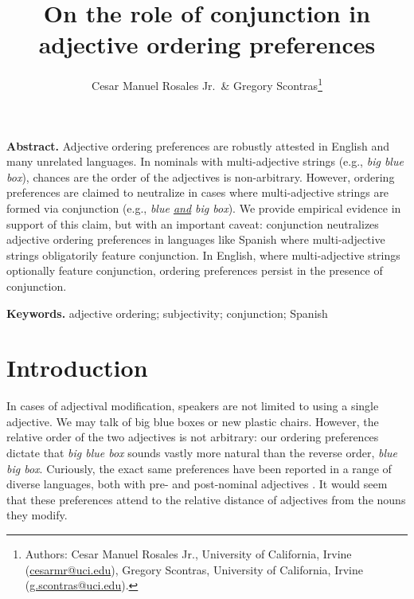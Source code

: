 \documentclass[12pt,letterpaper]{article}
\title{
	On the role of conjunction in adjective ordering preferences
}
\author{Cesar Manuel Rosales Jr.~\& Gregory Scontras\footnote{
		Authors: Cesar Manuel Rosales Jr., University of California, Irvine (\href{mailto:CESARMR@uci.edu}{cesarmr@uci.edu}),
		Gregory Scontras, University of California, Irvine (\href{mailto:g.scontras@uci.edu}{g.scontras@uci.edu}).
	}
}
\renewenvironment{abstract}{%
\noindent\begin{minipage}{1\textwidth}
\setlength{\leftskip}{0.4in}
\setlength{\rightskip}{0.4in}
\textbf{Abstract.}}
{\end{minipage}}
\newenvironment{keywords}{%
\vspace{.5em}
\noindent\begin{minipage}{1\textwidth}
\setlength{\leftskip}{0.4in}
\setlength{\rightskip}{0.4in}
\textbf{Keywords.}}
{\end{minipage}}
\begin{document}
 

\setlength{\Extopsep}{6pt}
\setlength{\Exlabelsep}{9pt}		%
 
\maketitle

\begin{abstract}
	Adjective ordering preferences are robustly attested in English and many unrelated languages. In nominals with multi-adjective strings (e.g., \emph{big blue box}), chances are the order of the adjectives is non-arbitrary. However, ordering preferences are claimed to neutralize in cases where multi-adjective strings are formed via conjunction (e.g., \emph{blue \uline{and} big box}). We provide empirical evidence in support of this claim, but with an important caveat: conjunction neutralizes adjective ordering preferences in languages like Spanish where multi-adjective strings obligatorily feature conjunction. In English, where multi-adjective strings optionally feature conjunction, ordering preferences persist in the presence of conjunction.
\end{abstract}

\begin{keywords}
	adjective ordering; subjectivity; conjunction; Spanish
\end{keywords}

\section{Introduction}

In cases of adjectival modification, speakers are not limited to using a single adjective. We may talk of big blue boxes or new plastic chairs. However, the relative order of the two adjectives is not arbitrary: our ordering preferences dictate that \emph{big blue box} sounds vastly more natural than the reverse order, \emph{blue big box}. Curiously, the exact same preferences have been reported in a range of diverse languages, both with pre- and post-nominal adjectives \citep[e.g., Hungarian, Dutch, Mandarin Chinese, Indonesian, Tagalog;][]{Martin1969competence,hetzron1978,dixon1982,sproatshih1991,samontescontras2019}. It would seem that these preferences attend to the relative distance of adjectives from the nouns they modify.
\end{document}
